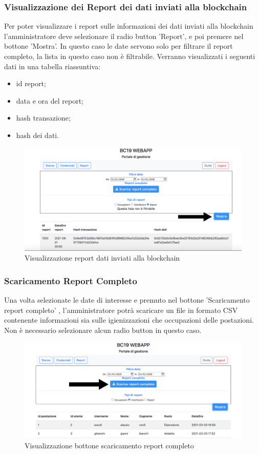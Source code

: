 \subsubsection{Visualizzazione dei Report dei dati inviati alla blockchain}
Per poter visualizzare i report sulle informazioni dei dati inviati alla blockchain l'amministratore deve selezionare il radio button 'Report', e poi premere nel bottone 'Mostra'. In questo caso le date servono solo per filtrare il report completo, la lista in questo caso non è filtrabile.
Verranno visualizzati i seguenti dati in una tabella riassuntiva:
\begin{itemize}
\item id report;
\item data e ora del report;
\item hash transazione;
\item hash dei dati.
\end{itemize}
\begin{figure}[H]
	\centering
	\includegraphics[width=15cm]{res/images/bottoneReportR.png}
	\caption{Visualizzazione report dati inviati alla blockchain}
\end{figure}

\subsubsection{Scaricamento Report Completo}
Una volta selezionate le date di interesse e premuto nel bottone 'Scaricamento report completo' , l'amministratore potrà scaricare un file in formato CSV contenente informazioni sia sulle igienizzazioni che occupazioni delle postazioni.
Non è necessario selezionare alcun radio button in questo caso.
\begin{figure}[H]
	\centering
	\includegraphics[width=15cm]{res/images/ReportCompleto.png}
	\caption{Visualizzazione bottone scaricamento report completo}
\end{figure}

